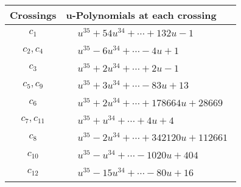 \documentclass[1p]{elsarticle_modified}
\theoremstyle{definition}
\begin{document}
\begin{tabular}{m{50pt}|m{274pt}}
Crossings & \hspace{64pt}u-Polynomials at each crossing \\
\hline $$\begin{aligned}c_{1}\end{aligned}$$&$\begin{aligned}
&u^{35}+54 u^{34}+\cdots+132 u-1
\end{aligned}$\\
\hline $$\begin{aligned}c_{2},c_{4}\end{aligned}$$&$\begin{aligned}
&u^{35}-6 u^{34}+\cdots-4 u+1
\end{aligned}$\\
\hline $$\begin{aligned}c_{3}\end{aligned}$$&$\begin{aligned}
&u^{35}+2 u^{34}+\cdots+2 u-1
\end{aligned}$\\
\hline $$\begin{aligned}c_{5},c_{9}\end{aligned}$$&$\begin{aligned}
&u^{35}+3 u^{34}+\cdots-83 u+13
\end{aligned}$\\
\hline $$\begin{aligned}c_{6}\end{aligned}$$&$\begin{aligned}
&u^{35}+2 u^{34}+\cdots+178664 u+28669
\end{aligned}$\\
\hline $$\begin{aligned}c_{7},c_{11}\end{aligned}$$&$\begin{aligned}
&u^{35}+u^{34}+\cdots+4 u+4
\end{aligned}$\\
\hline $$\begin{aligned}c_{8}\end{aligned}$$&$\begin{aligned}
&u^{35}-2 u^{34}+\cdots+342120 u+112661
\end{aligned}$\\
\hline $$\begin{aligned}c_{10}\end{aligned}$$&$\begin{aligned}
&u^{35}- u^{34}+\cdots-1020 u+404
\end{aligned}$\\
\hline $$\begin{aligned}c_{12}\end{aligned}$$&$\begin{aligned}
&u^{35}-15 u^{34}+\cdots-80 u+16
\end{aligned}$\\
\hline
\end{tabular}\\~\\
\end{document}

